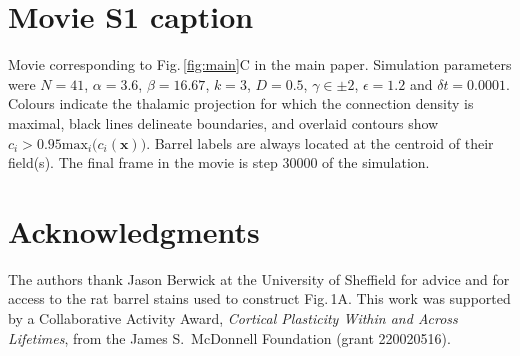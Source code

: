 \documentclass[9pt,lineno]{elife}
\newcommand{\cmnt}[1]{\textcolor{colcmnt}{#1}}
\newcommand{\MPtwo}[1]{\textcolor{colmptwo}{#1}}
\newcommand{\mb}[1]{\mathbf{#1}}
\begin{document}
\section{Movie S1 caption}

Movie corresponding to Fig.\,\ref{fig:main}C in the main paper. Simulation parameters were
\MPtwo{$N=41$, $\alpha=3.6$, $\beta=16.67$, $k=3$, $D=0.5$, $\gamma\in\pm 2$,
$\epsilon=1.2$ and $\delta{t}=0.0001$}. Colours indicate the thalamic
projection for which the connection density is maximal, black lines delineate
boundaries, and overlaid contours show
\cmnt{$c_i > 0.95 \mathrm{max}_i\big(c_i(\mb{x})\big)$. Barrel labels are
  always located at the centroid of their field(s).} The final frame in the movie
is step 30000 of the simulation.

\section{Acknowledgments}

The authors thank Jason Berwick at the University of Sheffield for advice and
for access to the rat barrel stains used to construct Fig.\,1A. This work was
supported by a Collaborative Activity Award, \emph{Cortical Plasticity Within
  and Across Lifetimes}, from the James S.~McDonnell Foundation (grant
220020516).


\end{document}
